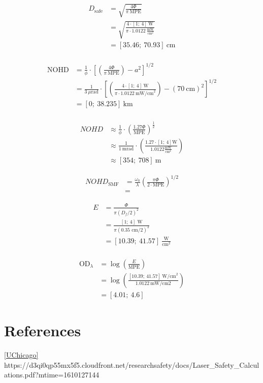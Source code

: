 \documentclass[a4paper]{article}
\begin{document}
\begin{align*}
D_{\textrm{safe}} &= \sqrt{\frac{4\Phi}{\pi\ \textrm{MPE}}} \\
	&= \sqrt{\frac{4\cdot [1;\ 4]\ \textrm{W}}{\pi \cdot 1.0122 \ \frac{\textrm{mW}}{\textrm{cm}^2}}}\\
	&= [35.46;\ 70.93] \ \textrm{cm}\\
\end{align*}

\begin{align*}
\textrm{NOHD} &= \frac{1}{\phi}\cdot \left[ \left(\frac{4\Phi}{\pi\ \textrm{MPE}}\right)-a^2\right]^{1/2}\\
	&= \frac{1}{3\ \mu \textrm{rad}}\cdot \left[ \left(\frac{4\cdot [1;\ 4]\ \textrm{W}}{\pi\cdot 1.0122\ \textrm{mW/cm}^2}\right)-(70\ \textrm{cm})^2\right]^{1/2} \\
	&= [0;\ 38.235]\ \textrm{km}\\
\end{align*}

\begin{align*}
NOHD &\approx \frac{1}{\phi}\cdot\left(\frac{1.27\Phi}{\textrm{MPE}}\right)^{\frac{1}{2}}\\
	&\approx \frac{1}{1\ \textrm{mrad}}\cdot\left(\frac{1.27\cdot[1;\ 4]\textrm{W}}{1.0122\frac{\textrm{mW}}{\textrm{cm}^2}}\right)\\
	&\approx [354;\ 708]\ \textrm{m}
\end{align*}

\begin{align*}
NOHD_{\textrm{SMF}} &= \frac{\omega_0}{\lambda}\left(\frac{\pi\Phi}{2\cdot\textrm{MPE}}\right)^{1/2}\\
	&= 
\end{align*}

\begin{align*}
E &= \frac{\Phi}{\pi (D_f/2)^2}  \\
  &= \frac{[1;\ 4] \textrm{ W}}{\pi (0.35 \textrm{ cm}/2)^2} \\
  &= [10.39;\ 41.57] \ \frac{\textrm{W}}{\textrm{cm}^2}\\
\end{align*}

\begin{align*}
\textrm{OD}_{\lambda} &= \log\left(\frac{E}{\textrm{MPE}}\right)\\
&= \log\left(\frac{[10.39;\ 41.57]\ \textrm{W/cm}^2}{1.0122\ \textrm{mW/cm2}}\right)\\
&= [4.01;\ 4.6]
\end{align*}


\section{References}
\ref{UChicago}
https://d3qi0qp55mx5f5.cloudfront.net/researchsafety/docs/Laser\_Safety\_Calculations.pdf?mtime=1610127144 
\end{document}
